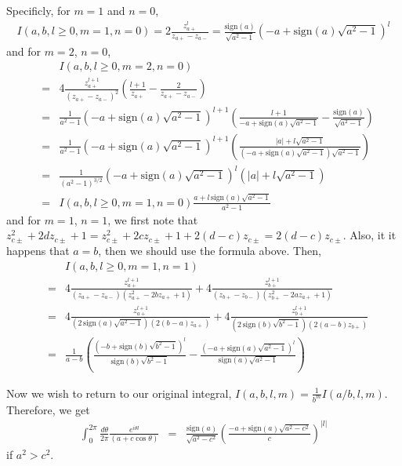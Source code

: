 \documentclass[aps,prc,preprint,tightenlines]{revtex4}
\newcommand{\sgn}{\mbox{sign}}
\begin{document}
Specificly, for $m=1$ and $n=0$,
\begin{eqnarray}
I(a,b,l\geq 0,m=1,n=0) = 2 \frac{z_{a+}^l}{z_{a+}-z_{a-}}
= \frac{\sgn(a)}{\sqrt{a^2-1}} \left(-a + \sgn(a) \sqrt{a^2-1}\right)^l 
\nonumber
\end{eqnarray}
and for $m=2$, $n=0$,
\begin{eqnarray}
&&I(a,b,l\geq 0,m=2,n=0) \nonumber \\
&=& 4 \frac{z_{a+}^{l+1}}{(z_{a+}-z_{a-})^2} 
\left( \frac{l+1}{z_{a+}} - \frac{2}{z_{a+} - z_{a-}} \right) \nonumber \\
&=& \frac{1}{a^2-1} \left(-a + \sgn(a) \sqrt{a^2-1}\right)^{l+1}
\left( \frac{l+1}{-a + \sgn(a) \sqrt{a^2-1}} - \frac{\sgn(a)}{\sqrt{a^2-1}}
\right) \nonumber \\
&=& \frac{1}{a^2-1} \left(-a + \sgn(a) \sqrt{a^2-1}\right)^{l+1}
\left( 
\frac{|a| + l \sqrt{a^2-1}}{(-a + \sgn(a) \sqrt{a^2-1}) \sqrt{a^2-1}} 
\right) \nonumber \\
&=& \frac{1}{(a^2-1)^{3/2}} \left(-a + \sgn(a) \sqrt{a^2-1}\right)^l
\left(|a| + l \sqrt{a^2-1}\right) \nonumber \\
&=& I(a,b,l\geq 0,m=1,n=0) \frac{a + l \, \sgn(a) \sqrt{a^2-1}}{a^2-1}
\nonumber
\end{eqnarray}
and for $m=1$, $n=1$, we first note that
$z_{c\pm}^2 + 2 d z_{c\pm} + 1 
=z_{c\pm}^2 + 2 c z_{c\pm} + 1 + 2 (d-c) z_{c\pm} = 2 (d-c) z_{c\pm}$.
Also, it it happens that $a=b$, then we should use the formula above.
Then,
\begin{eqnarray}
&&I(a,b,l\geq 0,m=1,n=1)\nonumber \\
&=& 
4 \frac{z_{a+}^{l+1}}{(z_{a+}-z_{a-}) (z_{a+}^2 - 2 b z_{a+} + 1)} +
4 \frac{z_{b+}^{l+1}}{(z_{b+}-z_{b-}) (z_{b+}^2 - 2 a z_{a+} + 1)} 
\nonumber \\
&=& 
4 \frac{z_{a+}^{l+1}}{(2\, \sgn(a)\sqrt{a^2-1})(2 (b-a) z_{a+})} +
4 \frac{z_{b+}^{l+1}}{(2\, \sgn(b)\sqrt{b^2-1})(2 (a-b) z_{b+})} 
\nonumber \\
&=& \frac{1}{a-b} \left(
\frac{\left(-b+\sgn(b)\sqrt{b^2-1}\right)^l}{\sgn(b)\sqrt{b^2-1}} -
\frac{\left(-a+\sgn(a)\sqrt{a^2-1}\right)^l}{\sgn(a)\sqrt{a^2-1}} \right)
\nonumber
\end{eqnarray}

Now we wish to return to our original integral,
$I(a,b,l,m) = \frac{1}{b^m} I(a/b,l,m)$.  Therefore, we get
\begin{eqnarray}
\int_0^{2\pi} \frac{d\theta}{2\pi}
\frac{e^{i \theta l}}{(a + c \cos\theta)}
&=&
\frac{\sgn(a)}{\sqrt{a^2-c^2}} 
\left(\frac{-a + \sgn(a) \sqrt{a^2-c^2}}{c}\right)^{|l|}
\end{eqnarray}
if $a^2>c^2$.
\end{document}
